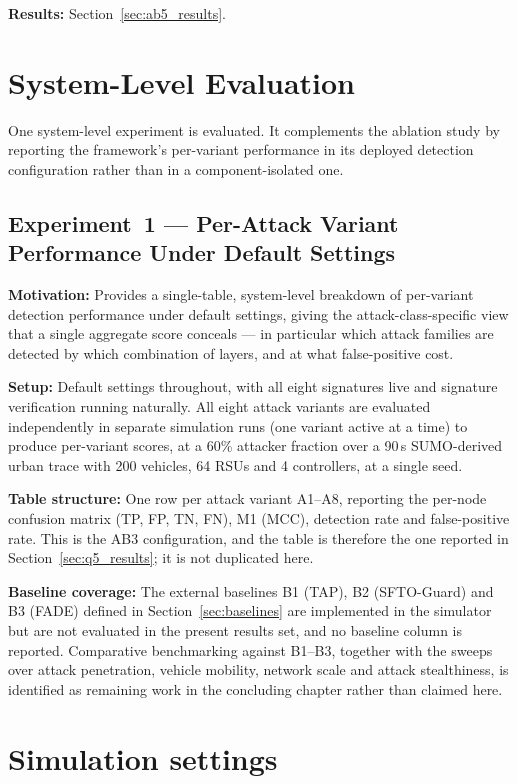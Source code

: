 \documentclass[12pt, a4paper]{report}
\begin{document}
{{\textbf{Results:} Section~\ref{sec:ab5_results}.

\section{System-Level Evaluation}
\label{sec:benchmarking}

One system-level experiment is evaluated. It
complements the ablation study by reporting the
framework's per-variant performance in its deployed
detection configuration rather than in a
component-isolated one.

\subsection{Experiment~1 --- Per-Attack Variant
Performance Under Default Settings}
\label{sec:exp1}

\textbf{Motivation:} Provides a single-table,
system-level breakdown of per-variant detection
performance under default settings, giving the
attack-class-specific view that a single aggregate
score conceals --- in particular which attack
families are detected by which combination of
layers, and at what false-positive cost.

\textbf{Setup:} Default settings throughout, with all
eight signatures live and signature verification
running naturally. All eight attack variants are
evaluated independently in separate simulation runs
(one variant active at a time) to produce per-variant
scores, at a 60\% attacker fraction over a 90\,s
\ac{SUMO}-derived urban trace with 200 vehicles, 64
\ac{RSU}s and 4 controllers, at a single seed.

\textbf{Table structure:} One row per attack variant
A1--A8, reporting the per-node confusion matrix
(TP, FP, TN, FN), M1 (\ac{MCC}), detection rate and
false-positive rate. This is the AB3 configuration,
and the table is therefore the one reported in
Section~\ref{sec:q5_results}; it is not duplicated
here.

\textbf{Baseline coverage:} The external baselines
B1 (TAP), B2 (SFTO-Guard) and B3 (FADE) defined in
Section~\ref{sec:baselines} are implemented in the
simulator but are not evaluated in the present
results set, and no baseline column is reported.
Comparative benchmarking against B1--B3, together
with the sweeps over attack penetration, vehicle
mobility, network scale and attack stealthiness, is
identified as remaining work in
the concluding chapter rather than claimed
here.

\section{Simulation settings}
\label{sec:simulation}

}}
\end{document}
